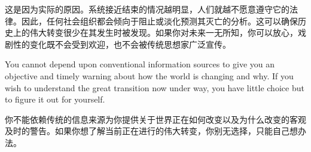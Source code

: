 \begin{paracol}{2}
\switchcolumn
这是因为实际的原因。系统接近结束的情况越明显，人们就越不愿意遵守它的法律。因此，任何社会组织都会倾向于阻止或淡化预测其灭亡的分析。这可以确保历史上的伟大转变很少在其发生时被发现。如果你对未来一无所知，你可以放心，戏剧性的变化既不会受到欢迎，也不会被传统思想家广泛宣传。

\switchcolumn*
You cannot depend upon conventional information sources to give you an objective and timely warning about how the world is changing and why. If you wish to understand the great transition now under way, you have little choice but to figure it out for yourself.  

\switchcolumn
你不能依赖传统的信息来源为你提供关于世界正在如何改变以及为什么改变的客观及时的警告。如果你想了解当前正在进行的伟大转变，你别无选择，只能自己想办法。

\end{paracol}

